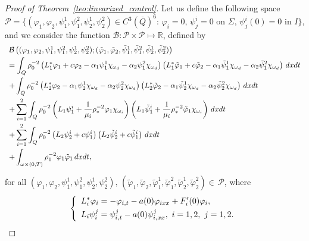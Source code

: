 \documentclass[11pt,a4paper]{amsart}
\numberwithin{equation}{section}
\begin{document}
\begin{proof}[Proof of Theorem~\ref{teo:linearized_control}] Let us define  the following space
$$
{\mathcal{P}}=\{ (\varphi_{1}, \varphi_{2}, \psi^{1}_{1}, \psi^{2}_{1},  \psi^{1}_{2}, \psi^{2}_{2})\in C^{3}(\overline{Q})^{6}: \, \varphi_{i}=0,\, \psi^{i}_{j}=0\,\,\mbox{on}\,\, \Sigma,\, \psi^{i}_{j}(0)=0\,\, \mbox{in}\,\,  I \},
$$and we consider the function $\mathcal{B}: {\mathcal{P}}\times {\mathcal{ P}}\mapsto \mathbb{R}$, defined by 
$$\begin{array}{l}
	\mathcal{B}\left( (\varphi_{1},\varphi_{2},\psi^{1}_{1},\psi^{2}_{1},\psi^{1}_{2},\psi^{2}_{2});(\tilde{\varphi}_{1},\tilde{\varphi}_{2},\tilde{\psi}^{1}_{1},\tilde{\psi}^{2}_{1},\tilde{\psi}^{1}_{2}, \tilde{\psi}^{2}_{2}) \right)\\
	\noalign{\smallskip}
	\displaystyle 	= \int_{Q} \rho^{-2}_{0}\left(L^{*}_{1}\varphi_{1}+c\varphi_{2}-\alpha_{1}\psi^{1}_{1}\chi_{\omega_{d}}-\alpha_{2}\psi^{2}_{1}\chi_{\omega_{d}} \right) \left( L^{*}_{1}\tilde{\varphi}_{1}+c\tilde{\varphi}_{2}-\alpha_{1}\tilde{\psi}^{1}_{1}\chi_{\omega_{d}}-\alpha_{2}\tilde{\psi}^{2}_{1}\chi_{\omega_{d}} \right) \,dxdt \\
	\noalign{\smallskip}
	\displaystyle +\int_{Q} \rho^{-2}_{0}\left(L^{*}_{2}\varphi_{2}-\alpha_{1}\psi^{1}_{2}\chi_{\omega_{d}}-\alpha_{2}\psi^{2}_{2}\chi_{\omega_{d}} \right) \left( L^{*}_{2}\tilde{\varphi}_{2}-\alpha_{1}\tilde{\psi}^{1}_{2}\chi_{\omega_{d}}-\alpha_{2}\tilde{\psi}^{2}_{2}\chi_{\omega_{d}} \right) \,dxdt \\
	\noalign{\smallskip}
	\displaystyle +\sum^{2}_{i=1}\int_{Q}\rho^{-2}_{0}\left( L_{1}\psi^{i}_{1}+\frac{1}{\mu_{i}}\rho^{-2}_{*}\varphi_{1}\chi_{\omega_{i}}  \right)\left( L_{1}\tilde{\psi}^{i}_{1}+\frac{1}{\mu_{i}}\rho^{-2}_{*}\tilde{\varphi}_{1}\chi_{\omega_{i}}  \right)\,dxdt\\
	\noalign{\smallskip}
	\displaystyle  +\sum^{2}_{i=1}\int_{Q}\rho^{-2}_{0}\left(L_{2}\psi^{i}_{2}+c\psi^{i}_{1}\right)\left(L_{2}\tilde{\psi}^{i}_{2}+c\tilde{\psi}^{i}_{1}\right)\,dxdt\\
	\noalign{\smallskip}
	\displaystyle + \int_{\omega\times (0,T)}\rho^{-2}_{1}\varphi_{1}\tilde{\varphi}_{1}\,dxdt,\\
	\noalign{\smallskip}
\end{array}$$	for all $(\varphi_{1}, \varphi_{2}, \psi^{1}_{1}, \psi^{2}_{1},  \psi^{1}_{2}, \psi^{2}_{2}),\, (\tilde{\varphi}_{1}, \tilde{\varphi}_{2}, \tilde{\varphi}^{1}_{1}, \tilde{\varphi}^{2}_{1},  \tilde{\varphi}^{1}_{2}, \tilde{\varphi}^{2}_{2})\in \, \mathcal{P}$, where
$$
\left\{\begin{array}{l}
	\displaystyle L^{*}_{i}\varphi_{i}=-\varphi_{i,t}-a(0)\varphi_{ixx}+F'_{i}(0)\varphi_{i},\\
	\noalign{\smallskip}
	\displaystyle L_{i}\psi^{j}_{i}=\psi^{j}_{i,t}-a(0)\psi^{j}_{i,xx}, \, \, i=1, 2, \, \, j=1, 2.\end{array}\right.
$$


\end{proof}
\end{document}
